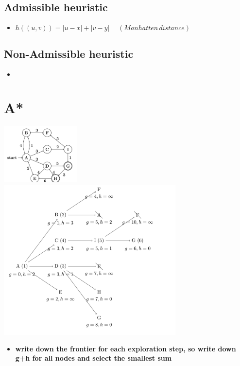 \documentclass[conference]{styles/acmsiggraph}
\begin{document}
\subsection{Admissible heuristic}

\begin{itemize}
    \item $h((u,v)) = |u-x| + |v - y| \; \quad (Manhatten \, distance)$ 
\end{itemize}

\subsection{Non-Admissible heuristic}
\begin{itemize}
    \item 
\end{itemize}

\section{A*}

\includegraphics[width=0.3\textwidth]{graph2.png}
\includegraphics[width=0.7\textwidth]{astar.png}

\begin{itemize}
    \item \textbf{write down the frontier for each exploration step, so write down g+h for all nodes and select the smallest sum}
\end{itemize}
\end{document}
